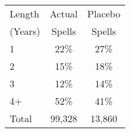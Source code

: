 \begin{tabular}{lcc}
\toprule
Length & Actual & Placebo \\
(Years) & Spells & Spells \\
\midrule
1 & 22\% & 27\% \\
2 & 15\% & 18\% \\
3 & 12\% & 14\% \\
4+ & 52\% & 41\% \\
Total &       99,328 &       13,860 \\
\bottomrule
\end{tabular}
